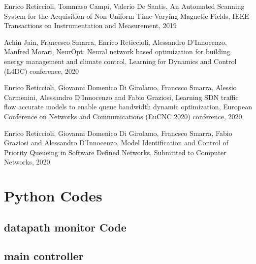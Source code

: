 \documentclass[12pt, a4paper, twoside, openright]{ociamthesis}  %
\begin{document}



\renewcommand{\bibname}{References}

\renewcommand{\bibname}{Publications}

\begin{thebibliography}{4}
 Enrico Reticcioli, Tommaso Campi, Valerio De Santis, An Automated Scanning System for the Acquisition of Non-Uniform Time-Varying Magnetic Fields, IEEE Transactions on Instrumentation and Measurement, 2019

Achin Jain, Francesco Smarra, Enrico Reticcioli, Alessandro D'Innocenzo, Manfred Morari, NeurOpt: Neural network based optimization for building energy management and climate control, Learning for Dynamics and Control (L4DC) conference, 2020

Enrico Reticcioli, Giovanni Domenico Di Girolamo, Francsco Smarra, Alessio Carmenini, Alessandro D’Innocenzo and Fabio Graziosi, Learning SDN traffic flow accurate models to enable queue bandwidth dynamic optimization, European Conference on Networks and Communications (EuCNC 2020) conference, 2020

Enrico Reticcioli, Giovanni Domenico Di Girolamo, Francsco Smarra, Fabio Graziosi and Alessandro D’Innocenzo, Model Identification and Control of Priority Queueing in Software Defined Networks, Submitted to Computer Networks, 2020
\end{thebibliography}
%
\appendix
\lstset{firstnumber=1}
\chapter{Python Codes}\label{Py_codes}
\section{datapath monitor Code}\label{datapath_monitor_TOS}

\section{main controller}\label{main_controller_TOS}

\end{document}

